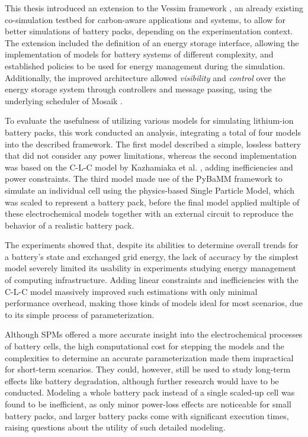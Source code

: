 This thesis introduced an extension to the Vessim framework \cite{vessim}, an already existing co-simulation testbed for carbon-aware applications and systems, to allow for better simulations of battery packs, depending on the experimentation context. The extension included the definition of an energy storage interface, allowing the implementation of models for battery systems of different complexity, and established policies to be used for energy management during the simulation. Additionally, the improved architecture allowed \textit{visibility} and \textit{control} over the energy storage system through controllers and message passing, using the underlying scheduler of Mosaik \cite{mosaik}.

To evaluate the usefulness of utilizing various models for simulating lithium-ion battery packs, this work conducted an analysis, integrating a total of four models into the described framework. The first model described a simple, lossless battery that did not consider any power limitations, whereas the second implementation was based on the C-L-C model by Kazhamiaka et al. \cite{kazhamiaka2019tractable}, adding inefficiencies and power constraints. The third model made use of the PyBaMM framework \cite{pybammbatteries} to simulate an individual cell using the physics-based Single Particle Model, which was scaled to represent a battery pack, before the final model applied multiple of these electrochemical models together with an external circuit to reproduce the behavior of a realistic battery pack.

The experiments showed that, despite its abilities to determine overall trends for a battery's state and exchanged grid energy, the lack of accuracy by the simplest model severely limited its usability in experiments studying energy management of computing infrastructure. Adding linear constraints and inefficiencies with the C-L-C model massively improved such estimations with only minimal performance overhead, making those kinds of models ideal for most scenarios, due to its simple process of parameterization.

Although SPMs offered a more accurate insight into the electrochemical processes of battery cells, the high computational cost for stepping the models and the complexities to determine an accurate parameterization made them impractical for short-term scenarios. They could, however, still be used to study long-term effects like battery degradation, although further research would have to be conducted. Modeling a whole battery pack instead of a single scaled-up cell was found to be inefficient, as only minor power-loss effects are noticeable for small battery packs, and larger battery packs come with significant execution times, raising questions about the utility of such detailed modeling.

